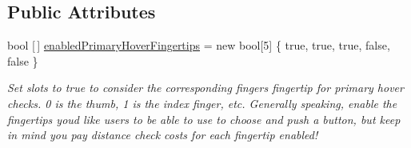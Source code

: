 \subsection*{Public Attributes}
\begin{DoxyCompactItemize}
\item 
bool \mbox{[}$\,$\mbox{]} \mbox{\hyperlink{class_leap_1_1_unity_1_1_interaction_1_1_interaction_hand_a09719682ae423b8b6d52d12a81a1b05c}{enabled\+Primary\+Hover\+Fingertips}} = new bool\mbox{[}5\mbox{]} \{ true, true, true, false, false \}
\begin{DoxyCompactList}\small\item\em Set slots to true to consider the corresponding finger\textquotesingle{}s fingertip for primary hover checks. 0 is the thumb, 1 is the index finger, etc. Generally speaking, enable the fingertips you\textquotesingle{}d like users to be able to use to choose and push a button, but keep in mind you pay distance check costs for each fingertip enabled! \end{DoxyCompactList}\end{DoxyCompactItemize}

